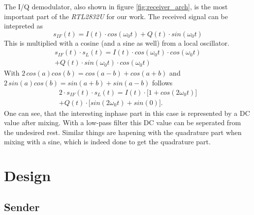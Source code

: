 \documentclass[conference]{IEEEtran}
\begin{document}
The I/Q demodulator, also shown in figure \ref{fig:receiver_arch}, is the most important part of the \textit{RTL2832U} for our work. The received signal can be intepreted as
\begin{equation}
	s_{IF}(t)=I(t) \cdot cos(\omega_{0}t) + Q(t) \cdot sin(\omega_{0}t)
\end{equation}     
This is multiplied with a cosine (and a sine as well) from a local oscillator.
\begin{multline}
        s_{IF}(t) \cdot s_L(t) = I(t) \cdot cos(\omega_{0}t) \cdot cos(\omega_{0}t)\\+ Q(t) \cdot sin(\omega_{0}t) \cdot cos(\omega_{0}t)
\end{multline}
With \ensuremath{2\,cos(a)cos(b)=cos(a-b)+cos(a+b)} and \ensuremath{2\,sin(a)cos(b)=sin(a+b)+sin(a-b)} follows
\begin{multline}
        2 \cdot s_{IF}(t) \cdot s_L(t) = I(t) \cdot \bigl[1+cos(2\omega_{0}t)\bigr]\\+ Q(t) \cdot \bigl[sin(2\omega_0t)+sin(0)\bigr].
\end{multline}
One can see, that the interesting inphase part in this case is represented by a DC value after mixing. With a low-pass filter this DC value can be seperated from the undesired rest. Similar things are hapening with the quadrature part when mixing with a sine, which is indeed done to get the quadrature part.  
\section{Design}

\subsection{Sender}
\end{document}

